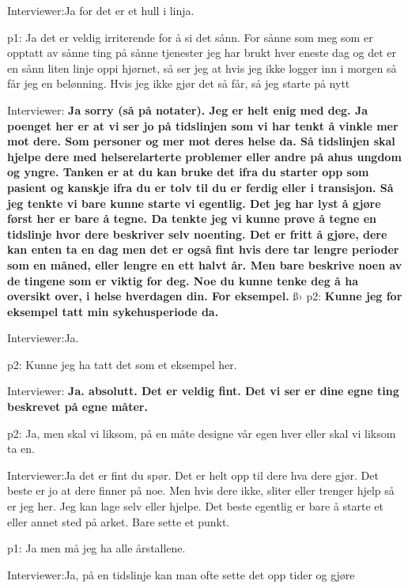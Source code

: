 \documentclass[../../MasterThesis.tex]{subfiles}
\begin{document}
\textcolor{myBlue} {Interviewer:}Ja for det er et hull i linja.

\textcolor{myGreen} {p1:} Ja det er veldig irriterende for å si det sånn. For sånne som meg som er opptatt av sånne ting på sånne tjenester jeg har brukt hver eneste dag og det er en sånn liten linje oppi hjørnet, så ser jeg at hvis jeg ikke logger inn i morgen så får jeg en belønning. Hvis jeg ikke gjør det så får, så jeg starte på nytt

\textcolor{myBlue} {Interviewer:} \textbf{Ja sorry (så på notater). Jeg er helt enig med deg. Ja poenget her er at vi ser jo på tidslinjen som vi har tenkt å vinkle mer mot dere. Som personer og mer mot deres helse da. Så tidslinjen skal hjelpe dere med helserelarterte problemer eller andre på ahus ungdom og yngre. Tanken er at du kan bruke det ifra du starter opp som pasient og kanskje ifra du er tolv til du er ferdig eller i transisjon. Så jeg tenkte vi bare kunne starte vi egentlig. Det jeg har lyst å gjøre først her er bare å tegne. Da tenkte jeg vi kunne prøve å tegne en tidslinje hvor dere beskriver selv noenting. Det er fritt å gjøre, dere kan enten ta en dag men det er også fint hvis dere tar lengre perioder som en måned, eller lengre en ett halvt år. Men bare beskrive noen av de tingene som er viktig for deg. Noe du kunne tenke deg å ha oversikt over, i helse hverdagen din. For eksempel.}
ß›
\textcolor{myYellow} {p2:} \textbf{Kunne jeg for eksempel tatt min sykehusperiode da.} 

\textcolor{myBlue} {Interviewer:}Ja.

\textcolor{myYellow} {p2:} Kunne jeg ha tatt det som et eksempel her.

\textcolor{myBlue} {Interviewer:} \textbf{Ja. absolutt. Det er veldig fint. Det vi ser er dine egne ting beskrevet på egne måter.} 

\textcolor{myYellow} {p2:} Ja, men skal vi liksom, på en måte designe vår egen hver eller skal vi liksom ta en.

\textcolor{myBlue} {Interviewer:}Ja det er fint du spør. Det er helt opp til dere hva dere gjør. Det beste er jo at dere finner på noe. Men hvis dere ikke, sliter eller trenger hjelp så er jeg her. Jeg kan lage selv eller hjelpe. Det beste egentlig er bare å starte et eller annet sted på arket. Bare sette et punkt.

\textcolor{myGreen} {p1:} Ja men må jeg ha alle årstallene.

\textcolor{myBlue} {Interviewer:}Ja, på en tidslinje kan man ofte sette det opp tider og gjøre 
\end{document}
